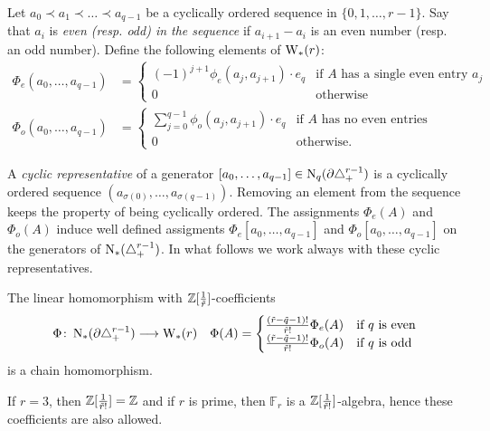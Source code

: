 Let $a_0\prec a_1\prec\ldots\prec a_{q-1}$ be a cyclically ordered sequence in $\{0,1,\ldots,r-1\}$. Say that $a_i$ is \emph{even (resp. \emph{odd}) in the sequence} if $a_{i+1}-a_i$ is an even number (resp. an odd number). 
Define the following elements of $\mathrm{W}_*(r)$:
\begin{align*}
    \Phi_e(a_0,\ldots,a_{q-1}) &= \begin{cases}
        (-1)^{j+1}\phi_e(a_j,a_{j+1})\cdot e_q & \text{if $A$ has a single even entry $a_j$} \\
        0 & \text{otherwise}
    \end{cases}
    \\
    \Phi_o(a_0,\ldots,a_{q-1}) &= \begin{cases}
        \sum_{j=0}^{q-1} \phi_o(a_j,a_{j+1})\cdot e_q & \text{if $A$ has no even entries} \\
        0 & \text{otherwise.}
    \end{cases}
\end{align*}

A \emph{cyclic representative} of a generator $[a_0,\ldots,a_{q-1}]\in \operatorname{N}_q(\partial \triangle_{+}^{r-1})$ is a cyclically ordered sequence $(a_{\sigma(0)},\ldots,a_{\sigma(q-1)})$. Removing an element from the sequence keeps the property of being cyclically ordered. The assignments $\Phi_e(A)$ and $\Phi_o(A)$ induce well defined assigments $\Phi_e[a_0,\ldots,a_{q-1}]$ and $\Phi_o[a_0,\ldots,a_{q-1}]$ on the generators of $\operatorname{N}_*(\triangle_{+}^{r-1})$. In what follows we work always with these cyclic representatives.
\begin{theorem} The linear homomorphism with $\mathbb{Z}[\frac{1}{\tilde{r}}]$-coefficients
\begin{align*}
    \Phi\colon \operatorname{N}_*(\partial \triangle_{+}^{r-1})&\longrightarrow \mathrm{W}_*(r) 
    &
    \Phi(A) = \begin{cases}
    \frac{(\tilde{r}-\tilde{q}-1)!}{\tilde{r}!}\Phi_e(A) & \text{if $q$ is even} \\
    \frac{(\tilde{r}-\tilde{q}-1)!}{\tilde{r}!}\Phi_o(A) & \text{if $q$ is odd} 
\end{cases}
\end{align*}
is a chain homomorphism.
\end{theorem}
\begin{remark}
	If $r=3$, then $\mathbb{Z}[\frac{1}{\tilde{r}!}] = \mathbb{Z}$ and if $r$ is prime, then $\mathbb{F}_r$ is a $\mathbb{Z}[\frac{1}{\tilde{r}!}]$-algebra, hence these coefficients are also allowed.
\end{remark}

